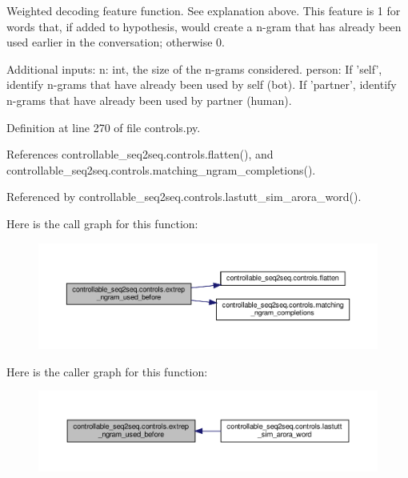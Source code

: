\begin{DoxyVerb}Weighted decoding feature function. See explanation above.
This feature is 1 for words that, if added to hypothesis, would create a n-gram that
has already been used earlier in the conversation; otherwise 0.

Additional inputs:
  n: int, the size of the n-grams considered.
  person: If 'self', identify n-grams that have already been used by self (bot).
    If 'partner', identify n-grams that have already been used by partner (human).
\end{DoxyVerb}
 

Definition at line 270 of file controls.\+py.



References controllable\+\_\+seq2seq.\+controls.\+flatten(), and controllable\+\_\+seq2seq.\+controls.\+matching\+\_\+ngram\+\_\+completions().



Referenced by controllable\+\_\+seq2seq.\+controls.\+lastutt\+\_\+sim\+\_\+arora\+\_\+word().

Here is the call graph for this function\+:
\nopagebreak
\begin{figure}[H]
\begin{center}
\leavevmode
\includegraphics[width=350pt]{namespacecontrollable__seq2seq_1_1controls_acce6374d8291de7af1df375285d65054_cgraph}
\end{center}
\end{figure}
Here is the caller graph for this function\+:
\nopagebreak
\begin{figure}[H]
\begin{center}
\leavevmode
\includegraphics[width=350pt]{namespacecontrollable__seq2seq_1_1controls_acce6374d8291de7af1df375285d65054_icgraph}
\end{center}
\end{figure}
\mbox{\label{namespacecontrollable__seq2seq_1_1controls_ae434171bae1e0ae82095b6d54ad4cadd}} 
